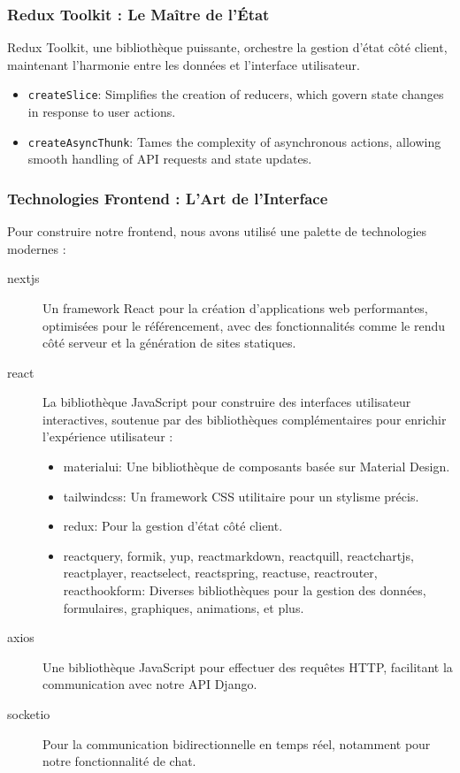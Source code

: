 \subsubsection{Redux Toolkit :  Le Maître de l'État}

Redux Toolkit, une bibliothèque puissante, orchestre la gestion d'état côté client, maintenant l'harmonie entre les données et l'interface utilisateur.

\begin{itemize}
    \item \texttt{createSlice}: Simplifies the creation of reducers, which govern state changes in response to user actions.
    \item \texttt{createAsyncThunk}: Tames the complexity of asynchronous actions, allowing smooth handling of API requests and state updates.
\end{itemize}

\subsubsection{Technologies Frontend : L'Art de l'Interface}

Pour construire notre frontend, nous avons utilisé une palette de technologies modernes :

\begin{description}
    \item[\gls{nextjs}] Un framework React pour la création d'applications web performantes, optimisées pour le référencement, avec des fonctionnalités comme le rendu côté serveur et la génération de sites statiques.
    \item[\gls{react}] La bibliothèque JavaScript pour construire des interfaces utilisateur interactives, soutenue par des bibliothèques complémentaires pour enrichir l'expérience utilisateur :
    \begin{itemize}
        \item \gls{materialui}: Une bibliothèque de composants basée sur Material Design.
        \item \gls{tailwindcss}: Un framework CSS utilitaire pour un stylisme précis.
        \item \gls{redux}: Pour la gestion d'état côté client.
        \item \gls{reactquery}, \gls{formik}, \gls{yup}, \gls{reactmarkdown}, \gls{reactquill}, \gls{reactchartjs}, \gls{reactplayer}, \gls{reactselect}, \gls{reactspring}, \gls{reactuse}, \gls{reactrouter}, \gls{reacthookform}: Diverses bibliothèques pour la gestion des données, formulaires, graphiques, animations, et plus.
        \end{itemize}
    \item[\gls{axios}] Une bibliothèque JavaScript pour effectuer des requêtes HTTP, facilitant la communication avec notre API Django.
    \item[\gls{socketio}] Pour la communication bidirectionnelle en temps réel, notamment pour notre fonctionnalité de chat.
\end{description}

